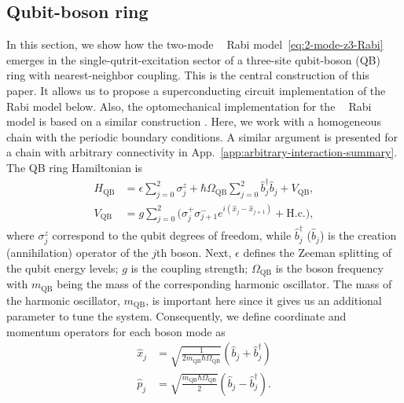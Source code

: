 \documentclass[reprint, aps, prx, amsmath, amssymb, longbibliography, superscriptaddress]{revtex4-2}
\DeclareMathOperator{\Zthree}{\mathbb{Z}_3}
\begin{document}
\subsection{Qubit-boson ring}
\label{sec:physical-implementation}

In this section, we show how the two-mode $\Zthree$ Rabi model~\eqref{eq:2-mode-z3-Rabi} emerges
in the single-qutrit-excitation sector of a three-site qubit-boson (QB) ring with
nearest-neighbor coupling. This is the central construction of this paper. It allows us to propose a superconducting circuit implementation of the $\Zthree$ Rabi model below. Also, the optomechanical implementation for the $\Zthree$ Rabi model is based on a similar construction \cite{sedov_chiral_2020}.  Here, we work with a homogeneous chain with the periodic boundary conditions. A similar argument is presented for a chain with arbitrary connectivity in App.~\ref{app:arbitrary-interaction-summary}. The QB ring Hamiltonian is
\begin{equation}
\label{eq:physical-hamiltonian}
  \begin{aligned}
    H_{\text{QB}} &= \epsilon \sum_{j=0}^{2} \sigma_j^z
      + \hbar \Omega_{\text{QB}} \sum_{j=0}^{2} \hat b_j^{\dagger} \hat b_j
      + V_{\text{QB}},
      \\
    V_{\text{QB}} &= g \sum_{j=0}^{2}
      \bigl( \sigma_j^{+} \sigma_{j+1}^{-}
      e^{ i ( \hat x_j - \hat x_{j+1} ) } + \text{H.c.} \bigr),
  \end{aligned}
\end{equation}
where $\sigma_j^z$ correspond to the qubit degrees of freedom, while $\hat b_j^{\dagger}$ ($\hat b_j$) is the creation (annihilation) operator of the $j$th boson. Next, $\epsilon$ defines the Zeeman splitting of the qubit energy levels; $g$ is the coupling strength; $\Omega_{\text{QB}}$ is the boson frequency with $m_{\text{QB}}$ being the mass of the corresponding harmonic oscillator. The mass of the harmonic oscillator, $m_{\text{QB}}$, is important here since it gives us an additional parameter to tune the system. Consequently, we define coordinate and momentum operators for each boson mode as
\begin{align}
    \hat x_j &= \sqrt{\frac{1}{2 m_{\text{QB}} \hbar \Omega_{\text{QB}}}}\left(\hat b_j + \hat b_j^{\dagger}\right) \\
    \hat p_j &= \sqrt{\frac{m_{\text{QB}} \hbar \Omega_{\text{QB}}}{2 }}\left(\hat b_j - \hat b_j^{\dagger}\right).
\end{align}

\end{document}
